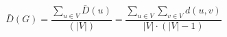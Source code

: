\documentclass[12pt]{article}
\begin{document}
\[
\bar{D}\left(G\right)
    = \frac
        {\displaystyle\sum_{u \in V}{\bar{D}\left(u\right)}}
        {\left(\left|V\right|\right)}
    = \frac
        {\displaystyle\sum_{u \in V}\sum_{v \in V}{d\left(u,v\right)}}
        {\left|V\right| \cdot \left(\left|V\right|-1\right)}
\]
\end{document}
